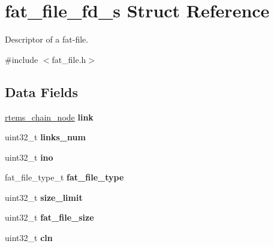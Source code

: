 \hypertarget{structfat__file__fd__s}{}\section{fat\+\_\+file\+\_\+fd\+\_\+s Struct Reference}
\label{structfat__file__fd__s}


Descriptor of a fat-\/file.  




{\ttfamily \#include $<$fat\+\_\+file.\+h$>$}

\subsection*{Data Fields}
\begin{DoxyCompactItemize}
\item 
\mbox{\label{structfat__file__fd__s_ace3272ceba5543a58ab069e018f08e6d}} 
\mbox{\hyperlink{structChain__Node__struct}{rtems\+\_\+chain\+\_\+node}} {\bfseries link}
\item 
\mbox{\label{structfat__file__fd__s_ac571cc815f17ac416020f19cf30d604e}} 
uint32\+\_\+t {\bfseries links\+\_\+num}
\item 
\mbox{\label{structfat__file__fd__s_a027924910f50c0c225400add295fc08e}} 
uint32\+\_\+t {\bfseries ino}
\item 
\mbox{\label{structfat__file__fd__s_ad754a5d50884f41d266aad2cd84145dd}} 
fat\+\_\+file\+\_\+type\+\_\+t {\bfseries fat\+\_\+file\+\_\+type}
\item 
\mbox{\label{structfat__file__fd__s_afa2cc439a3d8984a3ec62365c6bef19c}} 
uint32\+\_\+t {\bfseries size\+\_\+limit}
\item 
\mbox{\label{structfat__file__fd__s_ab21c89e7e890d0c15498269057e965ff}} 
uint32\+\_\+t {\bfseries fat\+\_\+file\+\_\+size}
\item 
\mbox{\label{structfat__file__fd__s_a47109dcec10cc74672f0ceeda143909d}} 
uint32\+\_\+t {\bfseries cln}
\item 
\mbox{\label{structfat__file__fd__s_abd71ecbc2182862f0f1ecfe28d5fbe66}} 

\end{DoxyCompactItemize}
